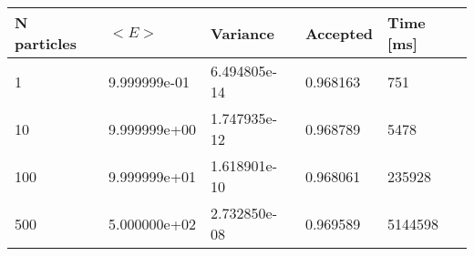 \begin{table}[h!]
\begin{tabular}{|l|l|l|l|l|}
\hline 
N particles & $<E>$ & Variance & Accepted & Time [ms]\\ 
 \hline 
1 & 9.999999e-01 & 6.494805e-14 & 0.968163 & 751 \\ \hline 
10 & 9.999999e+00 & 1.747935e-12 & 0.968789 & 5478 \\ \hline 
100 & 9.999999e+01 & 1.618901e-10 & 0.968061 & 235928 \\ \hline 
500 & 5.000000e+02 & 2.732850e-08 & 0.969589 & 5144598 \\ \hline 
\end{tabular}
\label{h:n2} 
\end{table}
